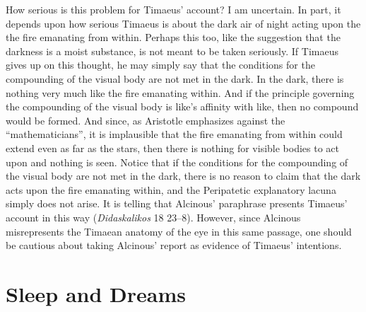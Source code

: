 How serious is this problem for Timaeus' account? I am uncertain. In part, it depends upon how serious Timaeus is about the dark air of night acting upon the the fire emanating from within. Perhaps this too, like the suggestion that the darkness is a moist substance, is not meant to be taken seriously. If Timaeus gives up on this thought, he may simply say that the conditions for the compounding of the visual body are not met in the dark. In the dark, there is nothing very much like the fire emanating within. And if the principle governing the compounding of the visual body is like's affinity with like, then no compound would be formed. And since, as Aristotle emphasizes against the ``mathematicians'', it is implausible that the fire emanating from within could extend even as far as the stars, then there is nothing for visible bodies to act upon and nothing is seen. Notice that if the conditions for the compounding of the visual body are not met in the dark, there is no reason to claim that the dark acts upon the fire emanating within, and the Peripatetic explanatory lacuna simply does not arise. It is telling that Alcinous' paraphrase presents Timaeus' account in this way (\emph{Didaskalikos} 18 23--8). However, since Alcinous misrepresents the Timaean anatomy of the eye in this same passage, one should be cautious about taking Alcinous' report as evidence of Timaeus' intentions.


\section{Sleep and Dreams} %
\label{sec:sleep_and_dreams}


